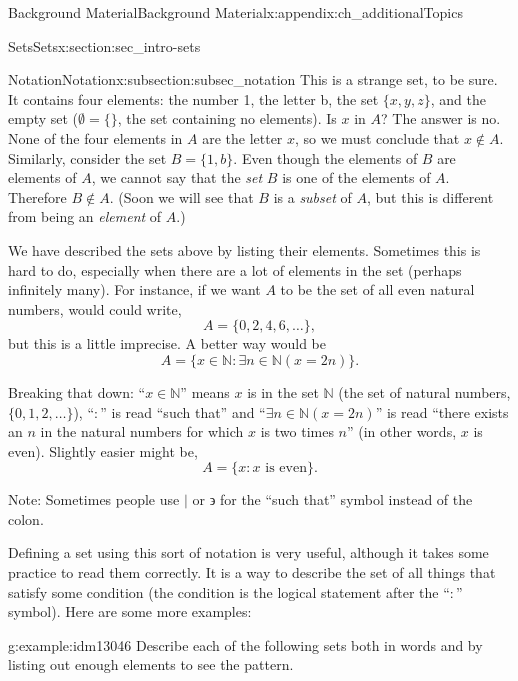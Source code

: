\documentclass[oneside,10pt,]{book}
\numberwithin{equation}{chapter}
\def\N{\mathbb N}
\def\st{:}
\begin{document}
\begin{appendixptx}{Background Material}{}{Background Material}{}{}{x:appendix:ch_additionalTopics}
\begin{sectionptx}{Sets}{}{Sets}{}{}{x:section:sec_intro-sets}
\begin{subsectionptx}{Notation}{}{Notation}{}{}{x:subsection:subsec_notation}
This is a strange set, to be sure. It contains four elements: the number 1, the letter b, the set \(\{x,y,z\}\), and the empty set (\(\emptyset = \{ \}\), the set containing no elements). Is \(x\) in \(A\)? The answer is no. None of the four elements in \(A\) are the letter \(x\), so we must conclude that \(x \notin A\). Similarly, consider the set \(B = \{1,b\}\). Even though the elements of \(B\) are elements of \(A\), we cannot say that the \emph{set} \(B\) is one of the elements of \(A\). Therefore \(B \notin A\). (Soon we will see that \(B\) is a \emph{subset} of \(A\), but this is different from being an \emph{element} of \(A\).)%
\par
We have described the sets above by listing their elements. Sometimes this is hard to do, especially when there are a lot of elements in the set (perhaps infinitely many). For instance, if we want \(A\) to be the set of all even natural numbers, would could write,%
\begin{equation*}
A = \{0, 2, 4, 6, \ldots\},
\end{equation*}
but this is a little imprecise. A better way would be%
\begin{equation*}
A = \{x \in \N \st \exists n\in \N ( x = 2 n)\}.
\end{equation*}
%
\par
Breaking that down: ``\(x \in \N\)'' means \(x\) is in the set \(\N\) (the set of natural numbers, \(\{0,1,2,\ldots\}\)), ``\(:\)'' is read ``such that'' and ``\(\exists n\in \N (x = 2n) \)'' is read ``there exists an \(n\) in the natural numbers for which \(x\) is two times \(n\)'' (in other words, \(x\) is even). Slightly easier might be,%
\begin{equation*}
A = \{x \st x\text{ is even} \}.
\end{equation*}
%
\par
Note: Sometimes people use \(|\) or \(\backepsilon\) for the ``such that'' symbol instead of the colon.%
\par
Defining a set using this sort of notation is very useful, although it takes some practice to read them correctly. It is a way to describe the set of all things that satisfy some condition (the condition is the logical statement after the ``\(\st\)'' symbol). Here are some more examples:%
\begin{example}{}{g:example:idm13046}%
Describe each of the following sets both in words and by listing out enough elements to see the pattern.%
\par
%
\begin{enumerate}

\end{enumerate}
\end{example}
\end{subsectionptx}
\end{sectionptx}
\end{appendixptx}
\end{document}

